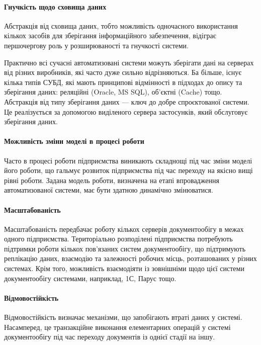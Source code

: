 \documentclass{memoir}
\begin{document}
\paragraph{Гнучкість щодо сховища даних}

Абстракція від сховища даних, тобто можливість одночасного використання кількох засобів для зберігання інформаційного забезпечення, відіграє першочергову роль у розширюваності та гнучкості системи.

Практично всі сучасні автоматизовані системи можуть зберігати дані на серверах від різних виробників, які часто дуже сильно відрізняються. Ба більше, існує кілька типів СУБД, які мають принципові відмінності в підходах до опису та зберігання даних: реляційні (Oracle, MS SQL), об’єктні (Cache) тощо. Абстракція від типу зберігання даних — ключ до добре спроєктованої системи. Це реалізується за допомогою виділеного сервера застосунків, який обслуговує зберігання даних.

\paragraph{Можливість зміни моделі в процесі роботи}

Часто в процесі роботи підприємства виникають складнощі під час зміни моделі його роботи, що гальмує розвиток підприємства під час переходу на якісно вищі рівні роботи. Задана модель роботи, визначена на етапі впровадження автоматизованої системи, має бути здатною динамічно змінюватися.

\paragraph{Масштабованість}

Масштабованість передбачає роботу кількох серверів документообігу в межах одного підприємства. Територіально розподілені підприємства потребують підтримки роботи кількох пов’язаних систем документообігу, що підтримують реплікацію даних, взаємодію та залежності робочих місць, розташованих у різних системах. Крім того, можливість взаємодіяти із зовнішніми щодо цієї системи документообігу системами, наприклад, 1С, Парус тощо.

\paragraph{Відмовостійкість}

Відмовостійкість визначає механізми, що запобігають втраті даних у системі. Насамперед, це транзакційне виконання елементарних операцій у системі документообігу під час переходу документів із однієї стадії на іншу.
\end{document}

